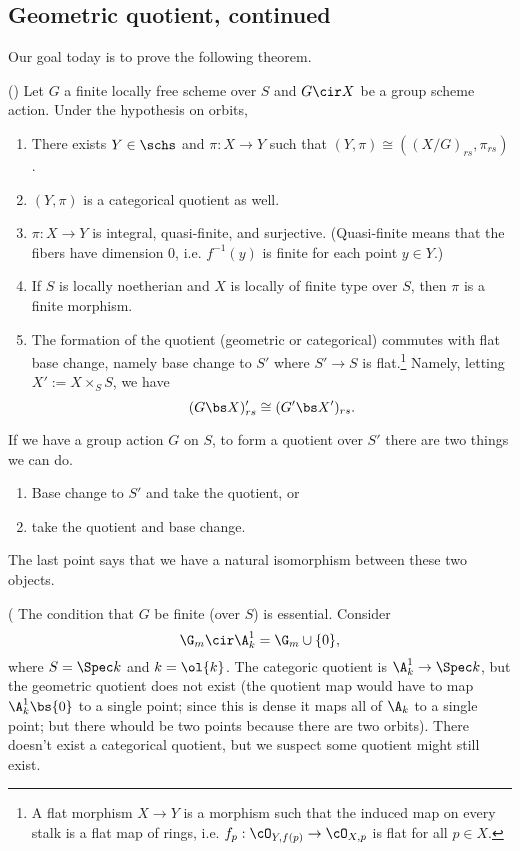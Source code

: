 \subsection{Geometric quotient, continued}
Our goal today is to prove the following theorem.
\begin{thm} (\cite[4.16]{GGBM}) 
Let $G$ a finite locally free scheme over $S$ and $G\cir X$ be a group scheme action. 
Under the hypothesis on orbits,
\begin{enumerate}
\item
There exists $Y\in \schs$ and $\pi:X\to Y$ such that $(Y,\pi)\cong ((X/G)_{rs},\pi_{rs})$.
\item
$(Y,\pi)$ is a categorical quotient as well.
\item
$\pi:X\to Y$ is integral, quasi-finite, and surjective. (Quasi-finite means that the fibers have dimension 0, i.e. $f^{-1}(y)$ is finite for each point $y\in Y$.)
\item
If $S$ is locally noetherian and $X$ is locally of %
finite type over $S$, then $\pi$ is a finite morphism. %
\item The formation of the quotient (geometric or categorical) commutes with flat base change, namely base change to $S'$ where $S'\to S$  is flat.\footnote{A flat morphism $X\to Y$ is a morphism such that the induced map on every stalk is a flat map of rings, i.e. $f_p:\cO_{Y,f(p)}\to \cO_{X,p}$ is flat for all $p\in X$.} Namely, letting $X':=X\times_S S$, we have 
\[
(G\bs X)_{rs}'\cong (G'\bs X')_{rs}.
\]
\end{enumerate}
\end{thm}
If we have a group action $G$ on $S$, to form a quotient over $S'$ there are two things we can do. 
\begin{enumerate}
\item
Base change to $S'$ and take the quotient, or
\item
take the quotient and base change.
\end{enumerate}
The last point says that we have a natural isomorphism between these two objects.
\begin{rem} (\cite[4.6]{GGBM}
The condition that $G$ be finite (over $S$) is essential. 
Consider 
\[
\G_m\cir \A_k^1=\G_m\cup \{0\},
\]
where $S=\Spec k$ and $k=\ol{k}$. The categoric quotient is $\A_k^1\to \Spec k$, but the geometric quotient does not exist (the quotient map would have to map $\A_k^1\bs \{0\}$ to a single point; since this is dense it maps all of $\A_k$ to a single point; but there whould be two points because there are two orbits). 
There doesn't exist a categorical quotient, but we suspect some quotient might still exist.
\end{rem}

